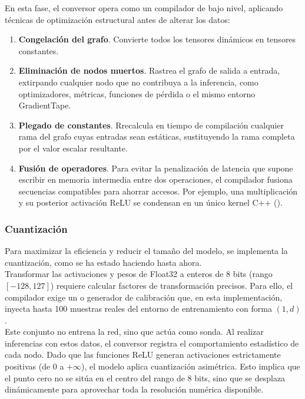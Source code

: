\documentclass[a4paper,12pt,twoside,final]{book}
\begin{document}
En esta fase, el conversor opera como un compilador de bajo nivel, aplicando técnicas de optimización estructural antes
de alterar los datos:
\begin{enumerate}
  \item \textbf{Congelación del grafo}. Convierte todos los tensores dinámicos  en tensores
  constantes.
  \item \textbf{Eliminación de nodos muertos}. Rastrea el grafo de salida a entrada, extirpando cualquier nodo que no
  contribuya a la inferencia, como optimizadores, métricas, funciones de pérdida o el mismo entorno GradientTape.
  \item \textbf{Plegado de constantes}. Rrecalcula en tiempo de compilación cualquier rama del grafo cuyas entradas
  sean estáticas, sustituyendo la rama completa por el valor escalar resultante.
  \item \textbf{Fusión de operadores}. Para evitar la penalización de latencia que supone escribir en memoria
  intermedia entre dos operaciones, el compilador fusiona secuencias compatibles para ahorrar accesos. Por ejemplo, una
  multiplicación  y su posterior activación ReLU se condensan en un único kernel C$+$$+$
  ().
\end{enumerate}

\subsubsection{Cuantización}
Para maximizar la eficiencia y reducir el tamaño del modelo, se implementa la cuantización, como se ha estado haciendo
hasta ahora.\\

Transformar las activaciones y pesos de Float32 a enteros de 8 bits (rango $[-128, 127]$) requiere calcular factores de
transformación precisos. Para ello, el compilador exige un  o generador de calibración que,
en esta implementación, inyecta hasta 100 muestras reales del entorno de entrenamiento con forma $(1, d)$.\\

Este conjunto no entrena la red, sino que actúa como sonda. Al realizar inferencias con estos datos, el conversor
registra el comportamiento estadístico de cada nodo. Dado que las funciones ReLU generan activaciones estrictamente
positivas (de $0$ a $+\infty$), el modelo aplica cuantización asimétrica. Esto implica que el punto cero no se sitúa en
el centro del rango de 8 bits, sino que se desplaza dinámicamente para aprovechar toda la resolución numérica
disponible.\\
\end{document}
